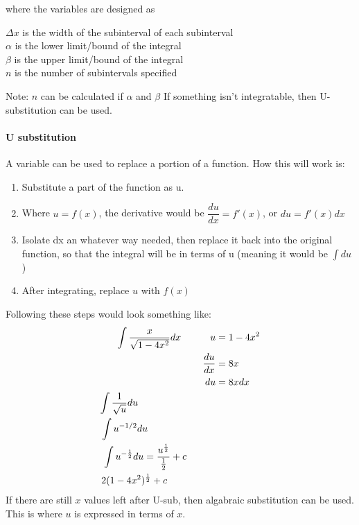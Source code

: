 \documentclass{article} %
\begin{document}
                        where the variables are designed as
                        \begin{center}
                            $\Delta x$ is the width of the subinterval of each subinterval\\
                            $\alpha$ is the lower limit/bound of the integral\\
                            $\beta$ is the upper limit/bound of the integral\\
                            $n$ is the number of subintervals specified\\
                        \end{center}
                        Note: $n$ can be calculated if $\alpha$ and $\beta$
                        If something isn't integratable, then U-substitution can be used.
                    \paragraph{U substitution}
                        A variable can be used to replace a portion of a function. How this will work is:
                        \begin{enumerate}
                            \item Substitute a part of the function as u.
                            \item Where $u = f(x)$, the derivative would be $\dfrac{du}{dx} = f'(x)$, or $du = f'(x)dx$
                            \item Isolate dx an whatever way needed, then replace it back into the original function, so that the integral will be in terms of u (meaning it would be $\int du$)
                            \item After integrating, replace $u$ with $f(x)$
                        \end{enumerate}
                        Following these steps would look something like:
                        \begin{align*}
                            \int \dfrac{x}{\sqrt{1-4x^2}}dx \hspace{30px}
                            u &= 1-4x^2\\
                            \dfrac{du}{dx} &= 8x\\
                            du&=8xdx \\
                            \int \dfrac{1}{\sqrt{u}}du \hspace{80px}\\
                            \int u^{-1/2}du \hspace{70px}\\
                            \int u^{-\frac{1}{2}}du = \dfrac{u^{\frac{1}{2}}}{\frac{1}{2}}+c\hspace{30px}\\
                            2(1-4x^2)^{\frac{1}{2}}+c\hspace*{50px}
                        \end{align*}
                        If there are still $x$ values left after U-sub, then algabraic substitution can be used. This is where $u$ is expressed in terms of $x$.
\end{document}
